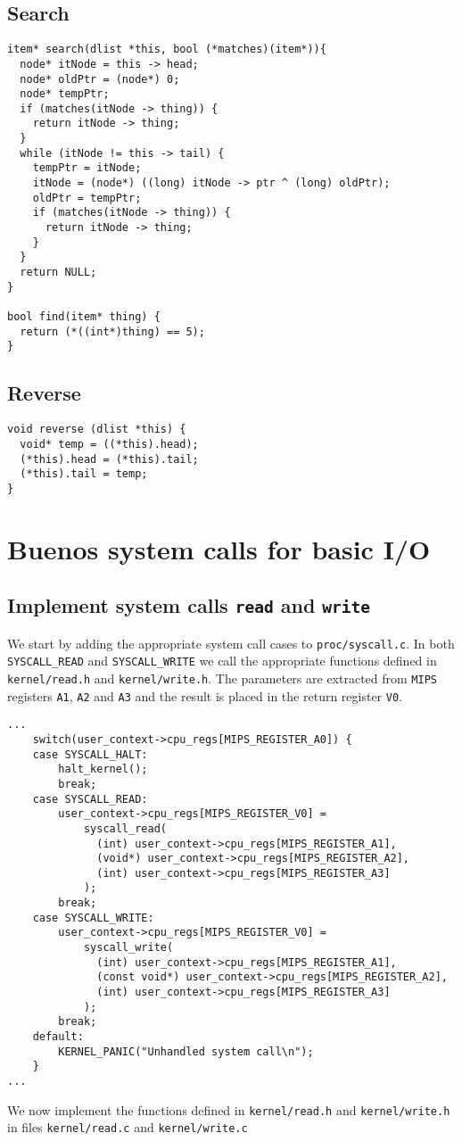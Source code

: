 \documentclass[a4paper,12pt]{article}
\begin{document}
\subsection{Search}
\begin{lstlisting}
item* search(dlist *this, bool (*matches)(item*)){
  node* itNode = this -> head;
  node* oldPtr = (node*) 0;
  node* tempPtr;
  if (matches(itNode -> thing)) {
    return itNode -> thing;
  }
  while (itNode != this -> tail) {
    tempPtr = itNode;
    itNode = (node*) ((long) itNode -> ptr ^ (long) oldPtr);
    oldPtr = tempPtr;
    if (matches(itNode -> thing)) {
      return itNode -> thing;
    }
  }
  return NULL;
}

bool find(item* thing) { 
  return (*((int*)thing) == 5);
} 
\end{lstlisting}

\subsection{Reverse}
\begin{lstlisting}
void reverse (dlist *this) {
  void* temp = ((*this).head);
  (*this).head = (*this).tail;
  (*this).tail = temp;
}
\end{lstlisting}
\section{Buenos system calls for basic I/O}
\subsection{Implement system calls \texttt{read} and \texttt{write}}
We start by adding the appropriate system call cases to \texttt{proc/syscall.c}. In both \texttt{SYSCALL\_READ} and \texttt{SYSCALL\_WRITE} we call the appropriate functions defined in \texttt{kernel/read.h} and \texttt{kernel/write.h}. The parameters are extracted from \texttt{MIPS} registers \texttt{A1}, \texttt{A2} and \texttt{A3} and the result is placed in the return register \texttt{V0}.
\begin{lstlisting}
...
    switch(user_context->cpu_regs[MIPS_REGISTER_A0]) {
    case SYSCALL_HALT:
        halt_kernel();
        break;
    case SYSCALL_READ:
        user_context->cpu_regs[MIPS_REGISTER_V0] =
            syscall_read(
              (int) user_context->cpu_regs[MIPS_REGISTER_A1],
              (void*) user_context->cpu_regs[MIPS_REGISTER_A2],
              (int) user_context->cpu_regs[MIPS_REGISTER_A3]
            );
        break;
    case SYSCALL_WRITE:
        user_context->cpu_regs[MIPS_REGISTER_V0] =
            syscall_write(
              (int) user_context->cpu_regs[MIPS_REGISTER_A1],
              (const void*) user_context->cpu_regs[MIPS_REGISTER_A2],
              (int) user_context->cpu_regs[MIPS_REGISTER_A3]
            );
        break;
    default: 
        KERNEL_PANIC("Unhandled system call\n");
    }
...
\end{lstlisting}
We now implement the functions defined in \texttt{kernel/read.h} and \texttt{kernel/write.h} in files \texttt{kernel/read.c} and \texttt{kernel/write.c}
\end{document}
